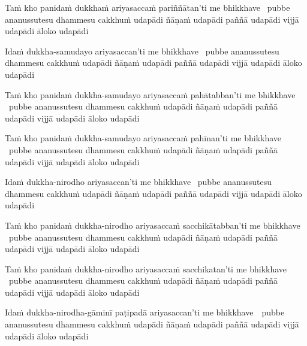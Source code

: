 \begin{pali-hang}
  Taṁ kho panidaṁ dukkhaṁ ariyasaccaṁ pariññātan'ti me bhikkhave \breathmark\ pubbe ananussutesu dhammesu cakkhuṁ udapādi ñāṇaṁ udapādi paññā udapādi vijjā udapādi āloko udapādi
\end{pali-hang}

\begin{pali-hang}
  Idaṁ dukkha-samudayo ariyasaccan'ti me bhikkhave \breathmark\ pubbe ananussutesu dhammesu cakkhuṁ udapādi ñāṇaṁ udapādi paññā udapādi vijjā udapādi āloko udapādi
\end{pali-hang}

\begin{pali-hang}
  Taṁ kho panidaṁ dukkha-samudayo ariyasaccaṁ pahātabban'ti me bhikkhave \breathmark\ pubbe ananussutesu dhammesu cakkhuṁ udapādi ñāṇaṁ udapādi paññā udapādi vijjā udapādi āloko udapādi
\end{pali-hang}

\begin{pali-hang}
  Taṁ kho panidaṁ dukkha-samudayo ariyasaccaṁ pahīnan'ti me bhikkhave \breathmark\ pubbe ananussutesu dhammesu cakkhuṁ udapādi ñāṇaṁ udapādi paññā udapādi vijjā udapādi āloko udapādi
\end{pali-hang}

\begin{pali-hang}
  Idaṁ dukkha-nirodho ariyasaccan'ti me bhikkhave \breathmark\ pubbe ananussutesu dhammesu cakkhuṁ udapādi ñāṇaṁ udapādi paññā udapādi vijjā udapādi āloko udapādi
\end{pali-hang}

\begin{pali-hang}
  Taṁ kho panidaṁ dukkha-nirodho ariyasaccaṁ sacchikātabban'ti me bhikkhave \breathmark\ pubbe ananussutesu dhammesu cakkhuṁ udapādi ñāṇaṁ udapādi paññā udapādi vijjā udapādi āloko udapādi
\end{pali-hang}

\begin{pali-hang}
  Taṁ kho panidaṁ dukkha-nirodho ariyasaccaṁ sacchikatan'ti me bhikkhave \breathmark\ pubbe ananussutesu dhammesu cakkhuṁ udapādi ñāṇaṁ udapādi paññā udapādi vijjā udapādi āloko udapādi
\end{pali-hang}

\begin{pali-hang}
  Idaṁ dukkha-nirodha-gāminī paṭipadā ariyasaccan'ti me \mbox{bhikkhave}~\breathmark\ pubbe ananussutesu dhammesu cakkhuṁ udapādi ñāṇaṁ udapādi paññā udapādi vijjā udapādi āloko udapādi
\end{pali-hang}

